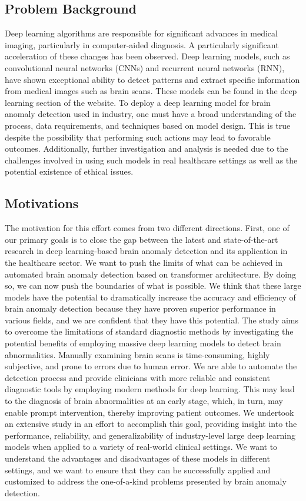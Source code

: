 \subsection{Problem Background}
Deep learning algorithms are responsible for significant advances in medical imaging, particularly in computer-aided diagnosis. A particularly significant acceleration of these changes has been observed. Deep learning models, such as convolutional neural networks (CNNs) and recurrent neural networks (RNN), have shown exceptional ability to detect patterns and extract specific information from medical images such as brain scans. These models can be found in the deep learning section of the website. To deploy a deep learning model for brain anomaly detection used in industry, one must have a broad understanding of the process, data requirements, and techniques based on model design. This is true despite the possibility that performing such actions may lead to favorable outcomes. Additionally, further investigation and analysis is needed due to the challenges involved in using such models in real healthcare settings as well as the potential existence of ethical issues.
\subsection{Motivations}
The motivation for this effort comes from two different directions. First, one of our primary goals is to close the gap between the latest and state-of-the-art research in deep learning-based brain anomaly detection and its application in the healthcare sector. We want to push the limits of what can be achieved in automated brain anomaly detection based on transformer architecture. By doing so, we can now push the boundaries of what is possible. We think that these large models have the potential to dramatically increase the accuracy and efficiency of brain anomaly detection because they have proven superior performance in various fields, and we are confident that they have this potential. The study aims to overcome the limitations of standard diagnostic methods by investigating the potential benefits of employing massive deep learning models to detect brain abnormalities. Manually examining brain scans is time-consuming, highly subjective, and prone to errors due to human error. We are able to automate the detection process and provide clinicians with more reliable and consistent diagnostic tools by employing modern methods for deep learning. This may lead to the diagnosis of brain abnormalities at an early stage, which, in turn, may enable prompt intervention, thereby improving patient outcomes. We undertook an extensive study in an effort to accomplish this goal, providing insight into the performance, reliability, and generalizability of industry-level large deep learning models when applied to a variety of real-world clinical settings. We want to understand the advantages and disadvantages of these models in different settings, and we want to ensure that they can be successfully applied and customized to address the one-of-a-kind problems presented by brain anomaly detection.
